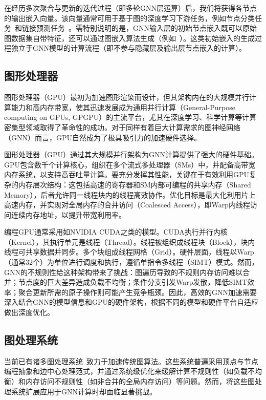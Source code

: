 在经历多次聚合与更新的迭代过程（即多轮GNN层运算）后，我们将获得各节点的输出嵌入向量。该向量通常可用于基于图的深度学习下游任务，例如节点分类任务~\cite{kaspar2010graph, gibert2012graph, duran2017learning}和链接预测任务~\cite{chen2005link, kunegis2009learning, tylenda2009towards}。需特别说明的是，GNN输入层的初始节点嵌入既可以原始图数据集自带特征，还可以通过图嵌入算法生成（例如~\cite{grover2016node2vec, transE, duvenaud2015convolutional}）。这类初始嵌入的生成过程独立于GNN模型的计算流程（即不参与隐藏层及输出层节点嵌入的计算）。

\subsection{图形处理器}
图形处理器（GPU）最初为加速图形渲染而设计，但其架构内在的大规模并行计算能力和高内存带宽，使其迅速发展成为通用并行计算（General-Purpose computing on GPUs, GPGPU）的主流平台，尤其在深度学习、科学计算等计算密集型领域取得了革命性的成功。对于同样有着巨大计算需求的图神经网络（GNN）而言，GPU自然成为了极具吸引力的加速硬件选择。

图形处理器（GPU）通过其大规模并行架构为GNN计算提供了强大的硬件基础。GPU包含数千个计算核心，组织在多个流式多处理器（SMs）中，并配备高带宽内存系统，以支持高吞吐量计算。要充分发挥其性能，关键在于有效利用GPU复杂的内存层次结构：这包括高速的寄存器和SM内部可编程的共享内存（Shared Memory），后者允许同一线程块内的线程高效协作。优化目标是最大化利用片上高速内存，并实现对全局内存的合并访问（Coalesced Access），即Warp内线程访问连续内存地址，以提升带宽利用率。

编程GPU通常采用如NVIDIA CUDA之类的模型。CUDA执行并行内核（Kernel），其执行单元是线程（Thread）。线程被组织成线程块（Block），块内线程可共享数据并同步。多个块组成线程网格（Grid）。硬件层面，线程以Warp（通常32个）为单位进行调度和执行，遵循单指令多线程（SIMT）模式。然而，GNN的不规则性给这种架构带来了挑战：图遍历导致的不规则内存访问难以合并；节点度的巨大差异造成负载不均衡；条件分支引发Warp发散，降低SIMT效率；聚合更新所需的原子操作则可能产生竞争瓶颈。因此，高效的GNN加速需要深入结合GNN的模型信息和GPU的硬件架构，根据不同的模型和硬件平台自适应做出深度优化。
\subsection{图处理系统}
当前已有诸多图处理系统~\cite{khorasani2014cusha, Tigr, wang2016gunrock, liu2015enterprise, liu2019simd}致力于加速传统图算法。这些系统普遍采用顶点与节点编程抽象和边中心处理范式，并通过系统级优化来缓解计算不规则性（如负载不均衡）和内存访问不规则性（如非合并的全局内存访问）等问题。然而，将这些图处理系统扩展应用于GNN计算时却面临显著挑战。

